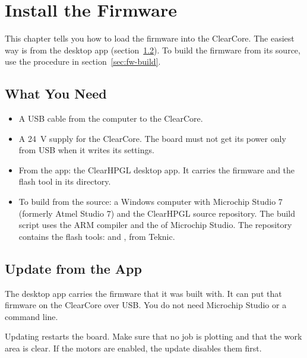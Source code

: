 \chapter{Install the Firmware}\label{ch:firmware}

This chapter tells you how to load the firmware into the ClearCore. The
easiest way is from the desktop app (section~\ref{sec:fw-app}). To build the
firmware from its source, use the procedure in
section~\ref{sec:fw-build}.

\section{What You Need}

\begin{itemize}
  \item A USB cable from the computer to the ClearCore.
  \item A 24~V supply for the ClearCore. The board must not get its power
        only from USB when it writes its settings.
  \item From the app: the ClearHPGL desktop app. It carries the firmware and
        the flash tool in its  directory.
  \item To build from the source: a Windows computer with Microchip Studio 7
        (formerly Atmel Studio 7) and the ClearHPGL source repository. The
        build script uses the ARM compiler and the  of
        Microchip Studio. The repository contains the flash tools:
         and ,
        from Teknic.
\end{itemize}

\section{Update from the App}\label{sec:fw-app}

The desktop app carries the firmware that it was built with. It can put that
firmware on the ClearCore over USB. You do not need Microchip Studio or a
command line.

\begin{warning}
Updating restarts the board. Make sure that no job is plotting and that the
work area is clear. If the motors are enabled, the update disables them
first.
\end{warning}

